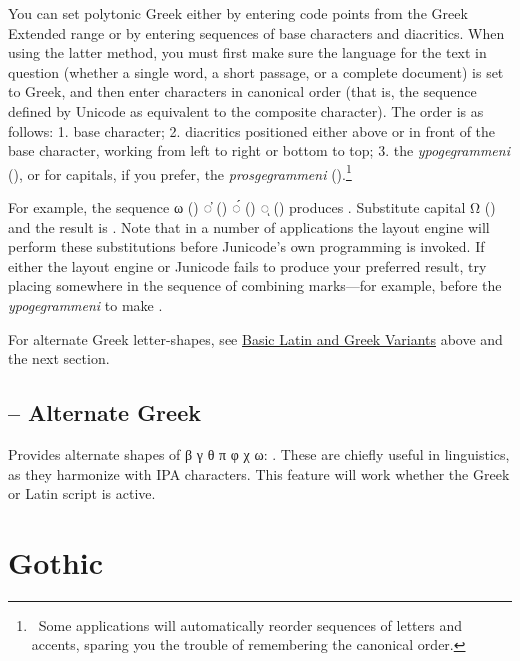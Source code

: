 You can set polytonic Greek either by entering code points from the Greek
Extended range or by entering sequences of base characters and diacritics.
When using the latter method, you must first make sure the language for the
text in question (whether a single word, a short passage, or a complete
document) is set to Greek, and then enter characters in canonical order
(that is, the sequence defined by Unicode as equivalent to the composite
character). The order is as follows: 1. base character; 2. diacritics
positioned either above or in front of the base character, working from left
to right or bottom to top; 3. the \textit{ypogegrammeni} (), or for
capitals, if you prefer, the \textit{prosgegrammeni} ().\footnote{\ Some
applications will automatically reorder sequences of letters and accents,
sparing you the trouble of remembering the canonical order.}

For example, the sequence ω () ◌̓ () ◌́ () ◌ͅ ()
produces .
Substitute capital Ω () and the result is
. Note that in a number of applications the layout
engine will perform these substitutions before Junicode’s own programming is
invoked. If either the layout engine or Junicode fails to produce your
preferred result, try placing \hyperlink{cgj}{} 
somewhere in the sequence of combining marks—for example, before the \textit{ypogegrammeni}
to make .

For alternate Greek letter-shapes, see \hyperlink{LatGrkVariants}{Basic Latin and Greek Variants} above
and the next section.

\subsection{ – Alternate Greek}
Provides alternate shapes of {β γ θ π φ χ ω}:
.
These are chiefly useful in linguistics, as they harmonize with IPA characters. This feature
will work whether the Greek or Latin script is active.

\section{Gothic}
